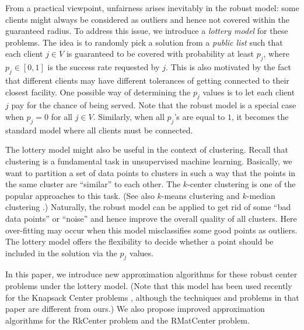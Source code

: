\documentclass[a4paper,11pt]{article}
\begin{document}
From a practical viewpoint, unfairness arises inevitably in the robust model: some clients might always be considered as outliers and hence not covered within the guaranteed radius. To address this issue, we introduce a \emph{lottery model} for these problems. The idea is to randomly pick a solution from a \emph{public list} such that each client $j \in V$ is guaranteed to be covered with probability at least $p_j$, where $p_j \in [0,1]$ is the success rate requested by $j$. This is also motivated by the fact that different clients may have different tolerances of getting connected to their closest facility. One possible way of determining the $p_j$ values is to let each client $j$ pay for the chance of being served. Note that the robust model is a special case when $p_j = 0$ for all $j \in V$. Similarly, when all $p_j$'s are equal to $1$, it becomes the standard model where all clients must be connected.

The lottery model might also be useful in the context of clustering. Recall that clustering is a fundamental task in unsupervised machine learning. Basically, we want to partition a set of data points to clusters in such a way that the points in the same cluster are ``similar'' to each other. The $k$-center clustering is one of the popular approaches to this task. (See also $k$-means clustering \cite{svensson, kanungo} and $k$-median clustering \cite{byrka_kmed, li_svensson, book:ws}.) Naturally, the robust model can be applied to get rid of some ``bad data points'' or ``noise'' and hence improve the overall quality of all clusters. Here over-fitting may occur when this model misclassifies some good points as outliers. The lottery model offers the flexibility to decide whether a point should be included in the solution via the $p_j$ values.

In this paper, we introduce new approximation algorithms for these robust center problems under the lottery model. (Note that this model has been used recently for the Knapsack Center problems  \cite{srdr}, although the techniques and problems in that paper are different from ours.) We also propose improved approximation algorithms for the \textsf{RkCenter} problem and the \textsf{RMatCenter} problem.
\end{document}

